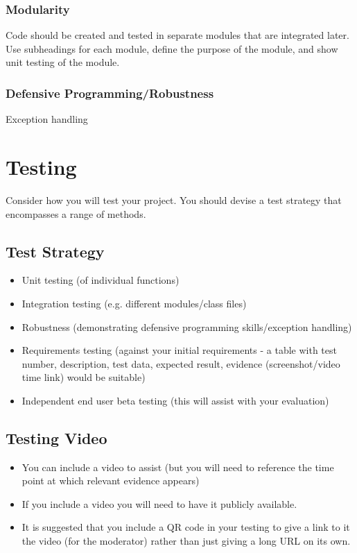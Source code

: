 \documentclass[10pt]{article}
\begin{document}
\subsubsection{Modularity}
Code should be created and tested in separate modules that are integrated later. Use subheadings for each module, define the purpose of the module, and show unit testing of the module.

\subsubsection{Defensive Programming/Robustness}
Exception handling

\section{Testing}
Consider how you will test your project. You should devise a test strategy that encompasses a range of methods.

\subsection{Test Strategy}
\begin{itemize}
    \item Unit testing (of individual functions)
    \item Integration testing (e.g. different modules/class files)
    \item Robustness (demonstrating defensive programming skills/exception handling)
    \item Requirements testing (against your initial requirements - a table with test number, description, test data, expected result, evidence (screenshot/video time link) would be suitable)
    \item Independent end user beta testing (this will assist with your evaluation)
\end{itemize}

\subsection{Testing Video}
\begin{itemize}
    \item You can include a video to assist (but you will need to reference the time point at which relevant evidence appears)
    \item If you include a video you will need to have it publicly available.
    \item It is suggested that you include a QR code in your testing to give a link to it the video (for the moderator) rather than just giving a long URL on its own.
\end{itemize}
\end{document}
